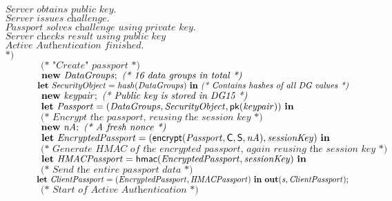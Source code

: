 \begin{tabbing}
$\textit{	Server obtains public key.}$\\
$\textit{	Server issues challenge.}$\\
$\textit{	Passport solves challenge using private key. }$\\
$\textit{	Server checks result using public key}$\\
$\textit{	Active Authentication finished.}$\\
$\textit{	*)}$\\
$\qquad\qquad $\\
$\qquad\qquad \textit{(* "Create" passport *)}$\\
$\qquad\qquad \kwl{new}\ \var{DataGroups};\ \textit{(* 16 data groups in total *)}$\\
$\qquad\qquad \mathbf{let}\ \mathit{SecurityObject} = \mathit{hash}(\mathit{DataGroups})\ \mathbf{in}\ \textit{(* Contains hashes of all DG values *)}$\\
$\qquad\qquad \kwl{new}\ \var{keypair};\ \textit{(* Public key is stored in DG15 *)}$\\
$\qquad\qquad \kwl{let}\ \var{Passport} = (\var{DataGroups}, \var{SecurityObject}, \kwf{pk}(\var{keypair}))\ \kwl{in}$\\
$\qquad\qquad $\\
$\qquad\qquad \textit{(* Encrypt the passport, reusing the session key *)}$\\
$\qquad\qquad \mathbf{new}\ \mathit{nA};\ \textit{(* A fresh nonce *)}$\\
$\qquad\qquad \kwl{let}\ \var{EncryptedPassport} = (\kwf{encrypt}(\var{Passport}, \kwc{C}, \kwc{S}, \var{nA}), \var{sessionKey})\ \kwl{in}$\\
$\qquad\qquad $\\
$\qquad\qquad \textit{(* Generate HMAC of the encrypted passport, again reusing the session key *)}$\\
$\qquad\qquad \kwl{let}\ \var{HMACPassport} = \kwf{hmac}(\var{EncryptedPassport}, \var{sessionKey})\ \kwl{in}$\\
$\qquad\qquad $\\
$\qquad\qquad \textit{(* Send the entire passport data *)}$\\
$\qquad\qquad \kwl{let}\ \var{ClientPassport} = (\var{EncryptedPassport}, \var{HMACPassport})\ \kwl{in}\ \kwl{out}(\var{s}, \var{ClientPassport});$\\
$\qquad\qquad $\\
$\qquad\qquad \textit{(* Start of Active Authentication *)}$\\
$\qquad\qquad $\\

\end{tabbing}
